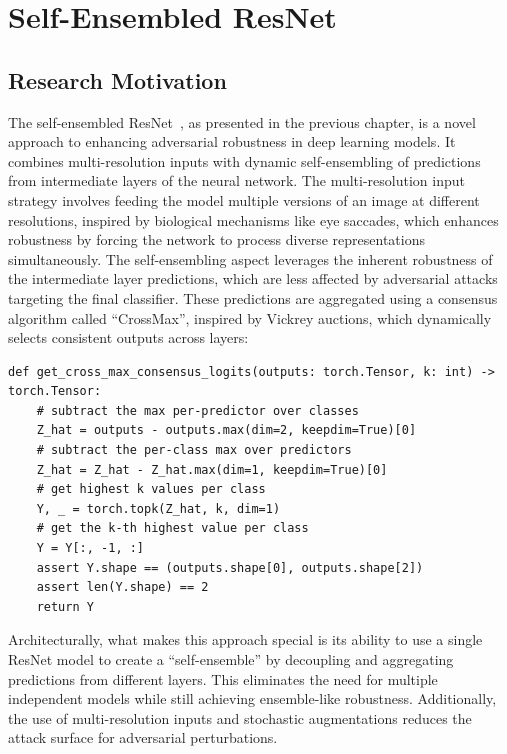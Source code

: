\documentclass[a4paper, oneside]{discothesis}
\begin{document}
% 
% 

\section{Self-Ensembled ResNet}

\subsection{Research Motivation}

The self-ensembled ResNet~\cite{fort2024ensemble}, as presented in the previous chapter, is a novel approach to enhancing adversarial robustness in deep learning models. It combines multi-resolution inputs with dynamic self-ensembling of predictions from intermediate layers of the neural network. The multi-resolution input strategy involves feeding the model multiple versions of an image at different resolutions, inspired by biological mechanisms like eye saccades, which enhances robustness by forcing the network to process diverse representations simultaneously. The self-ensembling aspect leverages the inherent robustness of the intermediate layer predictions, which are less affected by adversarial attacks targeting the final classifier. These predictions are aggregated using a consensus algorithm called ``CrossMax'', inspired by Vickrey auctions, which dynamically selects consistent outputs across layers:

\begin{verbatim}
def get_cross_max_consensus_logits(outputs: torch.Tensor, k: int) -> torch.Tensor:
    # subtract the max per-predictor over classes
    Z_hat = outputs - outputs.max(dim=2, keepdim=True)[0]
    # subtract the per-class max over predictors
    Z_hat = Z_hat - Z_hat.max(dim=1, keepdim=True)[0]
    # get highest k values per class
    Y, _ = torch.topk(Z_hat, k, dim=1)
    # get the k-th highest value per class
    Y = Y[:, -1, :]
    assert Y.shape == (outputs.shape[0], outputs.shape[2])
    assert len(Y.shape) == 2
    return Y
\end{verbatim}

Architecturally, what makes this approach special is its ability to use a single ResNet model to create a ``self-ensemble'' by decoupling and aggregating predictions from different layers. This eliminates the need for multiple independent models while still achieving ensemble-like robustness. Additionally, the use of multi-resolution inputs and stochastic augmentations reduces the attack surface for adversarial perturbations.
\end{document}
